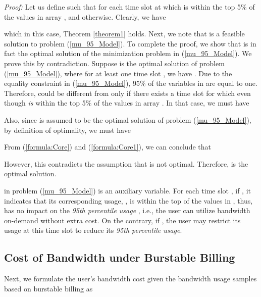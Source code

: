 \documentclass[10pt,journal,compsoc]{IEEEtran}
\begin{document}
\emph{Proof:} Let us define  such that  for each time slot  at which  is within the top 5\% of the values in array , and  otherwise. Clearly, we have

\noindent which in this case, Theorem \ref{theorem1} holds.
Next, we  note that  is a feasible solution to problem (\ref{mu_95_Model}). To complete the proof, we  show that  is in fact the optimal solution of the minimization problem in (\ref{mu_95_Model}). We prove this by contradiction. Suppose  is the optimal solution of problem (\ref{mu_95_Model}), where for at least one time slot , we have . Due to the equality constraint in (\ref{mu_95_Model}), 95\% of the variables in  are equal to one. Therefore,  could be different from  only if there exists a time slot  for which  even though  \emph{is} within the top 5\% of the values in array . In that case, we must have

Also, since  is assumed to be the optimal solution of problem (\ref{mu_95_Model}), by definition of optimality, we must have

From (\ref{formula:Core}) and (\ref{formula:Core1}), we can conclude that

However, this contradicts the assumption that  is not optimal. Therefore,  is the optimal solution.  


\vspace{0.2cm}



   in problem (\ref{mu_95_Model}) is an auxiliary  variable. For each time slot , if , it indicates that its corresponding usage, , is within the top  of the values in , thus,  has no impact on the \emph{95th percentile usage} , i.e.,  the user can  utilize bandwidth on-demand without extra cost. On the contrary, if , the user may restrict its usage at this time slot to reduce its \emph{95th percentile usage}. 


\subsection{Cost of Bandwidth under Burstable Billing}\label{subsec:problemformulation}


Next, we formulate the user's bandwidth cost given the bandwidth usage samples  based on burstable billing as
\end{document}
